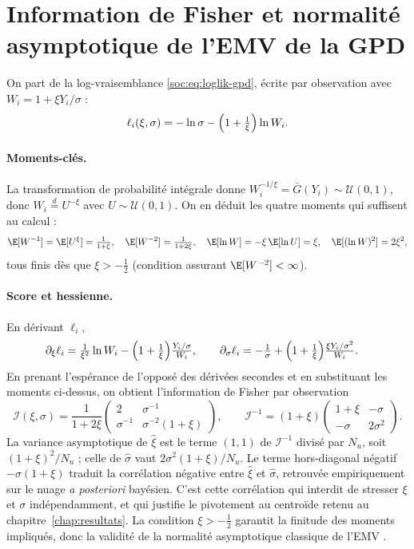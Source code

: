\section{Information de Fisher et normalité asymptotique de l'EMV de la GPD}
\label{soc:ann:fisher}
On part de la log-vraisemblance \eqref{soc:eq:loglik-gpd}, écrite par observation avec $W_i=1+\xi Y_i/\sigma$ :
\begin{equation}
\ell_i(\xi,\sigma)=-\ln\sigma-\Bigl(1+\tfrac1\xi\Bigr)\ln W_i.
\end{equation}

\paragraph{Moments-clés.} La transformation de probabilité intégrale donne $W_i^{-1/\xi}=\bar G(Y_i)\sim\mathcal U(0,1)$, donc $W_i\overset{d}{=}U^{-\xi}$ avec $U\sim\mathcal U(0,1)$. On en déduit les quatre moments qui suffisent au calcul :
\begin{equation}
\E[W^{-1}]=\E[U^{\xi}]=\tfrac{1}{1+\xi},\quad
\E[W^{-2}]=\tfrac{1}{1+2\xi},\quad
\E[\ln W]=-\xi\,\E[\ln U]=\xi,\quad
\E[(\ln W)^2]=2\xi^2,
\end{equation}
tous finis dès que $\xi>-\tfrac12$ (condition assurant $\E[W^{-2}]<\infty$).

\paragraph{Score et hessienne.} En dérivant $\ell_i$,
\begin{align*}
\partial_\xi\ell_i&=\tfrac{1}{\xi^2}\ln W_i-\Bigl(1+\tfrac1\xi\Bigr)\tfrac{Y_i/\sigma}{W_i},\qquad
\partial_\sigma\ell_i=-\tfrac1\sigma+\Bigl(1+\tfrac1\xi\Bigr)\tfrac{\xi Y_i/\sigma^2}{W_i}.
\end{align*}
En prenant l'espérance de l'opposé des dérivées secondes et en substituant les moments ci-dessus, on obtient l'information de Fisher par observation
\begin{equation}
\mathcal{I}(\xi,\sigma)=\frac{1}{1+2\xi}\begin{pmatrix} 2 & \sigma^{-1}\\[2pt] \sigma^{-1} & \sigma^{-2}(1+\xi)\end{pmatrix},\qquad
\mathcal{I}^{-1}=(1+\xi)\begin{pmatrix} 1+\xi & -\sigma\\[2pt] -\sigma & 2\sigma^2\end{pmatrix}.
\end{equation}
La variance asymptotique de $\hat\xi$ est le terme $(1,1)$ de $\mathcal I^{-1}$ divisé par $N_u$, soit $(1+\xi)^2/N_u$ ; celle de $\hat\sigma$ vaut $2\sigma^2(1+\xi)/N_u$. Le terme hors-diagonal négatif $-\sigma(1+\xi)$ traduit la corrélation négative entre $\hat\xi$ et $\hat\sigma$, retrouvée empiriquement sur le nuage \emph{a posteriori} bayésien. C'est cette corrélation qui interdit de stresser $\xi$ et $\sigma$ indépendamment, et qui justifie le pivotement au centroïde retenu au chapitre~\ref{chap:resultats}. La condition $\xi>-\tfrac12$ garantit la finitude des moments impliqués, donc la validité de la normalité asymptotique classique de l'EMV \citep{smith1987}.


